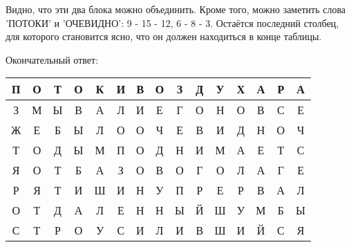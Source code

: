 \documentclass[letterpaper,11pt,openany]{book}
\begin{document}
Видно, что эти два блока можно объединить. Кроме того, можно заметить слова 'ПОТОКИ' и 'ОЧЕВИДНО': 9 - 15 - 12, 6 - 8 - 3. Остаётся последний столбец, для которого становится ясно, что он должен находиться в конце таблицы.

Окончательный ответ:

\medskip

{\centering\bf
\begin{tabular}{||c|c|c|c|c|c|c|c|c|c|c|c|c|c|c||}
\hline
П & О & Т & О & К & И & В & О & З & Д & У & Х & А & Р & А \\
\hline
З & М & Ы & В & А & Л & И & Е & Г & О & Н & О & В & С & Е \\
\hline
Ж & Е & Б & Ы & Л & О & О & Ч & Е & В & И & Д & Н & О & Ч \\
\hline
Т & О & Д & Ы & М & П & О & Д & Н & И & М & А & Е & Т & С \\
\hline
Я & О & Т & Б & А & З & О & В & О & Г & О & Л & А & Г & Е \\
\hline
Р & Я & Т & И & Ш & И & Н & У & П & Р & Е & Р & В & А & Л \\
\hline
О & Т & Д & А & Л & Е & Н & Н & Ы & Й & Ш & У & М & Б & Ы \\
\hline
С & Т & Р & О & У & С & И & Л & И & В & Ш & И & Й & С & Я \\
\hline
\end{tabular}
}

\medskip
\end{document}
